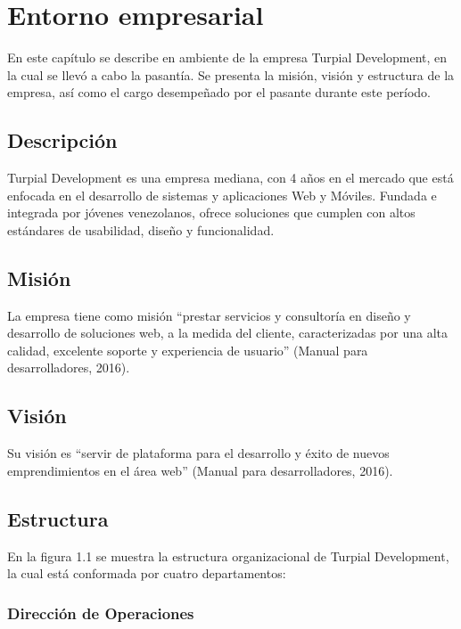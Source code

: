 \chapter{\textbf{Entorno empresarial}}

\thispagestyle{empty}

En este capítulo se describe en ambiente de la empresa Turpial Development, en
la cual se llevó a cabo la pasantía. Se presenta la misión, visión y estructura
de la empresa, así como el cargo desempeñado por el pasante durante este
período.


\section{Descripción}

Turpial Development es una empresa mediana, con 4 años en el mercado que está
enfocada en el desarrollo de sistemas y aplicaciones Web y Móviles. Fundada e
integrada por jóvenes venezolanos,  ofrece soluciones que cumplen con altos
estándares de usabilidad, diseño y funcionalidad.

\section{Misión}

La empresa tiene como misión “prestar servicios y consultoría en diseño y
desarrollo de soluciones web, a la medida del cliente, caracterizadas por una
alta calidad, excelente soporte y experiencia de usuario” (Manual para
desarrolladores, 2016).


\section{Visión}

Su visión es “servir de plataforma para el desarrollo y éxito de nuevos
emprendimientos en el área web” (Manual para desarrolladores, 2016).

\section{Estructura}

En la figura 1.1 se muestra la estructura organizacional de Turpial
Development, la cual está conformada por cuatro departamentos:

\subsection*{Dirección de Operaciones}

